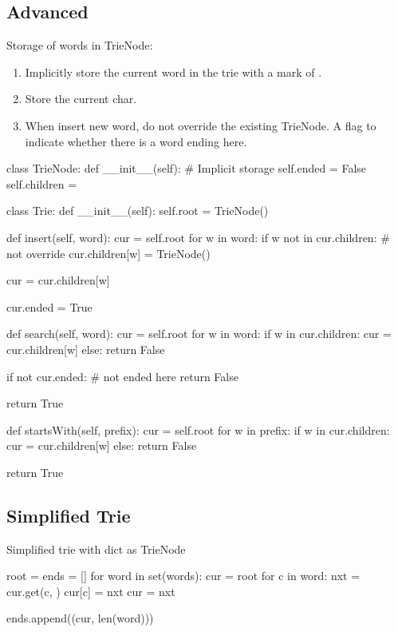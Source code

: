 \subsection{Advanced}
Storage of words in TrieNode: 
\begin{enumerate}
\item Implicitly store the current word in the trie with a mark of . 
\item Store the current char. 
\item When insert new word, do not override the existing TrieNode. A flag to indicate
whether there is a word ending here.
\end{enumerate}
\begin{python}
class TrieNode:
    def __init__(self):
        # Implicit storage
        self.ended = False
        self.children = {}


class Trie:
    def __init__(self):
        self.root = TrieNode()

    def insert(self, word):
        cur = self.root
        for w in word:
            if w not in cur.children:   # not override
                cur.children[w] = TrieNode()

            cur = cur.children[w]

        cur.ended = True

    def search(self, word):
        cur = self.root
        for w in word:
            if w in cur.children:
                cur = cur.children[w]
            else:
                return False

        if not cur.ended:  # not ended here
            return False

        return True

    def startsWith(self, prefix):
        cur = self.root
        for w in prefix:
            if w in cur.children:
                cur = cur.children[w]
            else:
                return False

        return True
\end{python}
\subsection{Simplified Trie}
Simplified trie with dict as TrieNode
\begin{python}
root = {}
ends = []
for word in set(words):
    cur = root
    for c in word:
        nxt = cur.get(c, {})
        cur[c] = nxt
        cur = nxt

    ends.append((cur, len(word)))
\end{python}
